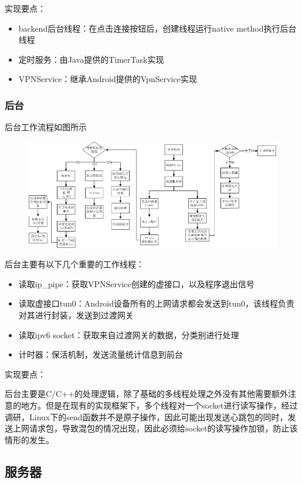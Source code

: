 \documentclass[paper=a4, fontsize=11pt, UTF8]{article} %
\begin{document}
实现要点：
\begin{itemize}
    \item backend后台线程：在点击连接按钮后，创建线程运行native method执行后台线程
    \item 定时服务：由Java提供的TimerTask实现
    \item VPNService：继承Android提供的VpnService实现
\end{itemize}

\subsubsection{后台}
后台工作流程如图所示
\begin{figure}[H]
    \centering
    \includegraphics[scale=0.5]{photos/back.png}
\end{figure}
后台主要有以下几个重要的工作线程：
\begin{itemize}
    \item 读取ip\_pipe：获取VPNService创建的虚接口，以及程序退出信号
    \item 读取虚接口tun0：Android设备所有的上网请求都会发送到tun0，该线程负责对其进行封装，发送到过渡网关
    \item 读取ipv6 socket：获取来自过渡网关的数据，分类别进行处理
    \item 计时器：保活机制，发送流量统计信息到前台
\end{itemize}

实现要点：

后台主要是C/C++的处理逻辑，除了基础的多线程处理之外没有其他需要额外注意的地方。但是在现有的实现框架下，多个线程对一个socket进行读写操作，经过调研，Linux下的send函数并不是原子操作，因此可能出现发送心跳包的同时，发送上网请求包，导致混包的情况出现，因此必须给socket的读写操作加锁，防止该情形的发生。

\subsection{服务器}
\end{document}
